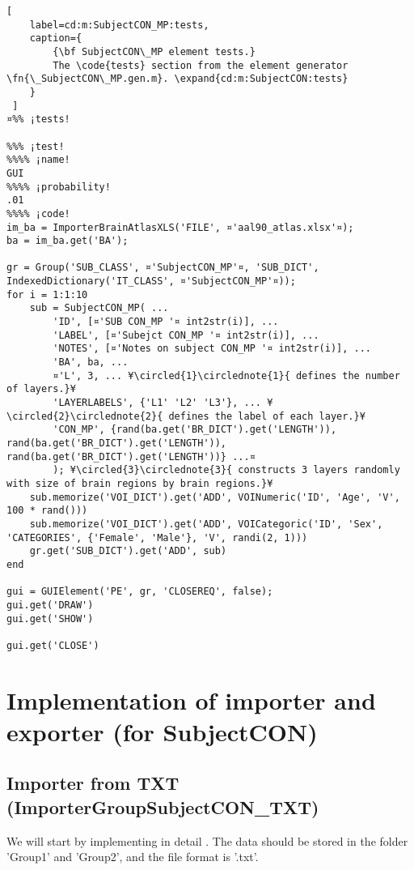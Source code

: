 \documentclass{tufte-handout}
\begin{document}
\begin{lstlisting}[
	label=cd:m:SubjectCON_MP:tests,
	caption={
		{\bf SubjectCON\_MP element tests.}
		The \code{tests} section from the element generator \fn{\_SubjectCON\_MP.gen.m}. \expand{cd:m:SubjectCON:tests}
	}
 ]
¤%% ¡tests!

%%% ¡test!
%%%% ¡name!
GUI
%%%% ¡probability!
.01
%%%% ¡code!
im_ba = ImporterBrainAtlasXLS('FILE', ¤'aal90_atlas.xlsx'¤);
ba = im_ba.get('BA');

gr = Group('SUB_CLASS', ¤'SubjectCON_MP'¤, 'SUB_DICT', IndexedDictionary('IT_CLASS', ¤'SubjectCON_MP'¤));
for i = 1:1:10 
    sub = SubjectCON_MP( ...
        'ID', [¤'SUB CON_MP '¤ int2str(i)], ...
        'LABEL', [¤'Subejct CON_MP '¤ int2str(i)], ...
        'NOTES', [¤'Notes on subject CON_MP '¤ int2str(i)], ...
        'BA', ba, ...
        ¤'L', 3, ... ¥\circled{1}\circlednote{1}{ defines the number of layers.}¥
        'LAYERLABELS', {'L1' 'L2' 'L3'}, ... ¥\circled{2}\circlednote{2}{ defines the label of each layer.}¥
        'CON_MP', {rand(ba.get('BR_DICT').get('LENGTH')), rand(ba.get('BR_DICT').get('LENGTH')), rand(ba.get('BR_DICT').get('LENGTH'))} ...¤
        ); ¥\circled{3}\circlednote{3}{ constructs 3 layers randomly with size of brain regions by brain regions.}¥
    sub.memorize('VOI_DICT').get('ADD', VOINumeric('ID', 'Age', 'V', 100 * rand()))
    sub.memorize('VOI_DICT').get('ADD', VOICategoric('ID', 'Sex', 'CATEGORIES', {'Female', 'Male'}, 'V', randi(2, 1)))
    gr.get('SUB_DICT').get('ADD', sub)
end

gui = GUIElement('PE', gr, 'CLOSEREQ', false);
gui.get('DRAW')
gui.get('SHOW')

gui.get('CLOSE')
\end{lstlisting}

\clearpage

\section{Implementation of importer and exporter (for SubjectCON)}

\subsection{Importer from TXT (ImporterGroupSubjectCON\_TXT)}

We will start by implementing in detail . The data should be stored in the folder 'Group1' and 'Group2', and the file format is '.txt'.
\end{document}
